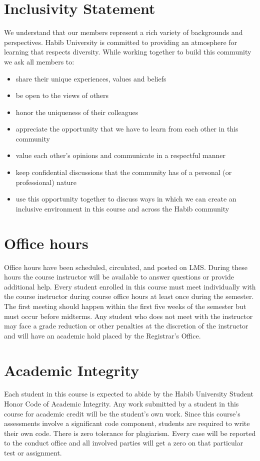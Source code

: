 \documentclass[a4paper,11pt]{article}
\begin{document}
\section{Inclusivity Statement}
We understand that our members represent a rich variety of backgrounds and perspectives. Habib University is committed to providing an atmosphere for learning that respects diversity. While working together to build this community we ask all members to:
\begin{itemize}
	\item share their unique experiences, values and beliefs
	\item be open to the views of others 
	\item honor the uniqueness of their colleagues
	\item appreciate the opportunity that we have to learn from each other in this community
	\item value each other's opinions and communicate in a respectful manner
	\item keep confidential discussions that the community has of a personal (or professional) nature 
	\item use this opportunity together to discuss ways in which we can create an inclusive environment in this course and across the Habib community 
\end{itemize}

\section{Office hours}
Office hours have been scheduled, circulated, and posted on LMS. During these hours the course instructor will be available to answer questions or provide additional help. Every student enrolled in this course must meet individually with the course instructor during course office hours at least once during the semester. The first meeting should happen within the first five weeks of the semester but must occur before midterms. Any student who does not meet with the instructor may face a grade reduction or other penalties at the discretion of the instructor and will have an academic hold placed by the Registrar's Office. 

\section{Academic Integrity}

Each student in this course is expected to abide by the Habib University Student Honor Code of Academic Integrity.  Any work submitted by a student in this course for academic credit will be the student's own work. Since this course's assessments involve a significant code component, students are required to write their own code. There is zero tolerance for plagiarism. Every case will be reported to the conduct office and all involved parties will get a zero on that particular test or assignment. 
\end{document}
